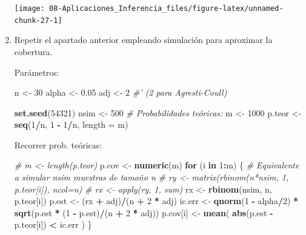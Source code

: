 \documentclass[]{book}
\newenvironment{Shaded}{\begin{snugshade}}{\end{snugshade}}
\newcommand{\KeywordTok}[1]{\textcolor[rgb]{0.13,0.29,0.53}{\textbf{#1}}}
\newcommand{\DataTypeTok}[1]{\textcolor[rgb]{0.13,0.29,0.53}{#1}}
\newcommand{\DecValTok}[1]{\textcolor[rgb]{0.00,0.00,0.81}{#1}}
\newcommand{\FloatTok}[1]{\textcolor[rgb]{0.00,0.00,0.81}{#1}}
\newcommand{\StringTok}[1]{\textcolor[rgb]{0.31,0.60,0.02}{#1}}
\newcommand{\CommentTok}[1]{\textcolor[rgb]{0.56,0.35,0.01}{\textit{#1}}}
\newcommand{\ControlFlowTok}[1]{\textcolor[rgb]{0.13,0.29,0.53}{\textbf{#1}}}
\newcommand{\OperatorTok}[1]{\textcolor[rgb]{0.81,0.36,0.00}{\textbf{#1}}}
\newcommand{\NormalTok}[1]{#1}
\theoremstyle{definition}
\theoremstyle{definition}
\theoremstyle{definition}
\theoremstyle{remark}
\begin{document}
\begin{enumerate}
  \begin{center}\texttt{[image: 08-Aplicaciones\_Inferencia\_files/figure-latex/unnamed-chunk-27-1]} \end{center}
\item
  Repetir el apartado anterior empleando simulación para aproximar la
  cobertura.

  Parámetros:

\begin{Shaded}
\begin{Highlighting}[]
\NormalTok{n <-}\StringTok{ }\DecValTok{30}
\NormalTok{alpha <-}\StringTok{ }\FloatTok{0.05}
\NormalTok{adj <-}\StringTok{ }\DecValTok{2}  \CommentTok{#' (2 para Agresti-Coull)}

\KeywordTok{set.seed}\NormalTok{(}\DecValTok{54321}\NormalTok{)}
\NormalTok{nsim <-}\StringTok{ }\DecValTok{500} 
\CommentTok{# Probabilidades teóricas:}
\NormalTok{m <-}\StringTok{ }\DecValTok{1000}
\NormalTok{p.teor <-}\StringTok{ }\KeywordTok{seq}\NormalTok{(}\DecValTok{1}\OperatorTok{/}\NormalTok{n, }\DecValTok{1} \OperatorTok{-}\StringTok{ }\DecValTok{1}\OperatorTok{/}\NormalTok{n, }\DataTypeTok{length =}\NormalTok{ m) }
\end{Highlighting}
\end{Shaded}

  Recorrer prob. teóricas:

\begin{Shaded}
\begin{Highlighting}[]
\CommentTok{# m <- length(p.teor)}
\NormalTok{p.cov <-}\StringTok{ }\KeywordTok{numeric}\NormalTok{(m)}
\ControlFlowTok{for}\NormalTok{ (i }\ControlFlowTok{in} \DecValTok{1}\OperatorTok{:}\NormalTok{m) \{}
  \CommentTok{# Equivalente a simular nsim muestras de tamaño n}
  \CommentTok{# ry <- matrix(rbinom(n*nsim, 1, p.teor[i]), ncol=n)}
  \CommentTok{# rx <- apply(ry, 1, sum)}
\NormalTok{  rx <-}\StringTok{ }\KeywordTok{rbinom}\NormalTok{(nsim, n, p.teor[i])}
\NormalTok{  p.est <-}\StringTok{ }\NormalTok{(rx }\OperatorTok{+}\StringTok{ }\NormalTok{adj)}\OperatorTok{/}\NormalTok{(n }\OperatorTok{+}\StringTok{ }\DecValTok{2} \OperatorTok{*}\StringTok{ }\NormalTok{adj)  }
\NormalTok{  ic.err <-}\StringTok{ }\KeywordTok{qnorm}\NormalTok{(}\DecValTok{1} \OperatorTok{-}\StringTok{ }\NormalTok{alpha}\OperatorTok{/}\DecValTok{2}\NormalTok{) }\OperatorTok{*}\StringTok{ }\KeywordTok{sqrt}\NormalTok{(p.est }\OperatorTok{*}\StringTok{ }\NormalTok{(}\DecValTok{1} \OperatorTok{-}\StringTok{ }\NormalTok{p.est)}\OperatorTok{/}\NormalTok{(n }\OperatorTok{+}\StringTok{ }\DecValTok{2} \OperatorTok{*}\StringTok{ }\NormalTok{adj))}
\NormalTok{  p.cov[i] <-}\StringTok{ }\KeywordTok{mean}\NormalTok{( }\KeywordTok{abs}\NormalTok{(p.est }\OperatorTok{-}\StringTok{ }\NormalTok{p.teor[i]) }\OperatorTok{<}\StringTok{ }\NormalTok{ic.err )}
\NormalTok{\}}
\end{Highlighting}
\end{Shaded}


\end{enumerate}
\end{document}
